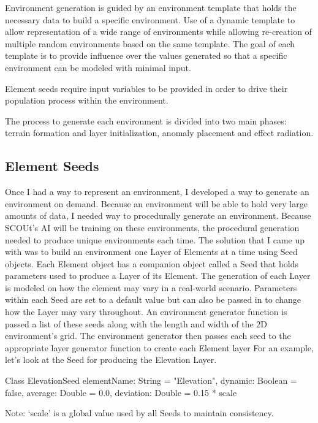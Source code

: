 Environment generation is guided by an environment template that holds the necessary data to build a specific environment. 
Use of a dynamic template to allow representation of a wide range of environments while allowing re-creation of multiple random environments based on the same template.
The goal of each template is to provide influence over the values generated so that a specific environment can be modeled with minimal input.

Element seeds require input variables to be provided in order to drive their population process within the environment.

The process to generate each environment is divided into two main phases: terrain formation and layer initialization, anomaly placement and effect radiation.


\subsection{Element Seeds}
Once I had a way to represent an environment, I developed a way to generate an environment on demand.
Because an environment will be able to hold very large amounts of data, I needed way to procedurally generate an environment.
Because SCOUt’s AI will be training on these environments, the procedural generation needed to produce unique environments each time.
The solution that I came up with was to build an environment one Layer of Elements at a time using Seed objects.
Each Element object has a companion object called a Seed that holds parameters used to produce a Layer of its Element.
The generation of each Layer is modeled on how the element may vary in a real-world scenario.
Parameters within each Seed are set to a default value but can also be passed in to change how the Layer may vary throughout.
An environment generator function is passed a list of these seeds along with the length and width of the 2D environment’s grid.
The environment generator then passes each seed to the appropriate layer generator function to create each Element layer
For an example, let’s look at the Seed for producing the Elevation Layer.

Class ElevationSeed {
	elementName: String = "Elevation",
    	dynamic: Boolean = false,
    	average: Double = 0.0,
    	deviation: Double = 0.15 * scale
}

Note: ‘scale’ is a global value used by all Seeds to maintain consistency.

